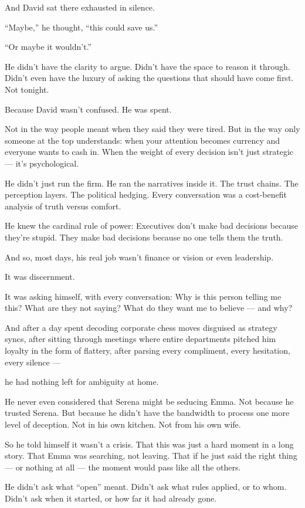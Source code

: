 And David sat there exhausted in silence.

``Maybe,'' he thought, ``this could save us.''

``Or maybe it wouldn’t.''

He didn’t have the clarity to argue.
Didn’t have the space to reason it through.
Didn’t even have the luxury of asking the questions that should have come first.
Not tonight.

Because David wasn’t confused.
He was spent.

Not in the way people meant when they said they were tired.
But in the way only someone at the top understands: when your attention becomes currency and everyone wants to cash in.
When the weight of every decision isn’t just strategic — it’s psychological.

He didn’t just run the firm.
He ran the narratives inside it.
The trust chains. The perception layers. The political hedging.
Every conversation was a cost-benefit analysis of truth versus comfort.

He knew the cardinal rule of power:
Executives don’t make bad decisions because they’re stupid.
They make bad decisions because no one tells them the truth.

And so, most days, his real job wasn’t finance or vision or even leadership.

It was discernment.

It was asking himself, with every conversation:
Why is this person telling me this? What are they not saying? What do they want me to believe — and why?

And after a day spent decoding corporate chess moves disguised as strategy syncs,
after sitting through meetings where entire departments pitched him loyalty in the form of flattery,
after parsing every compliment, every hesitation, every silence —

he had nothing left for ambiguity at home.

He never even considered that Serena might be seducing Emma.
Not because he trusted Serena.
But because he didn’t have the bandwidth to process one more level of deception.
Not in his own kitchen.
Not from his own wife.

So he told himself it wasn’t a crisis.
That this was just a hard moment in a long story.
That Emma was searching, not leaving.
That if he just said the right thing — or nothing at all — the moment would pass like all the others.

He didn’t ask what “open” meant.
Didn’t ask what rules applied, or to whom.
Didn’t ask when it started, or how far it had already gone.

